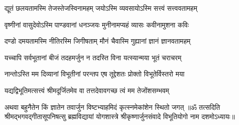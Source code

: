 \twolineshloka
{द्यूतं छलयतामस्मि तेजस्तेजस्विनामहम्}
{जयोऽस्मि व्यवसायोऽस्मि सत्त्वं सत्त्ववतामहम्}%

\twolineshloka
{वृष्णीनां वासुदेवोऽस्मि पाण्डवानां धनञ्जयः}
{मुनीनामप्यहं व्यासः कवीनामुशना कविः}%

\twolineshloka
{दण्डो दमयतामस्मि नीतिरस्मि जिगीषताम्}
{मौनं चैवास्मि गुह्यानां ज्ञानं ज्ञानवतामहम्}%

\twolineshloka
{यच्चापि सर्वभूतानां बीजं तदहमर्जुन}
{न तदस्ति विना यत्स्यान्मया भूतं चराचरम्}%

\twolineshloka
{नान्तोऽस्ति मम दिव्यानां विभूतीनां परन्तप}
{एष तूद्देशतः प्रोक्तो विभूतेर्विस्तरो मया}%

\twolineshloka
{यद्यद्विभूतिमत्सत्त्वं श्रीमदूर्जितमेव वा}
{तत्तदेवावगच्छ त्वं मम तेजोंशसम्भवम्}%

\twolineshloka
{अथवा बहुनैतेन किं ज्ञातेन तवार्जुन}
{विष्टभ्याहमिदं कृत्स्नमेकांशेन स्थितो जगत्}%
{॥ॐ तत्सदिति श्रीमद्भगवद्गीतासूपनिषत्सु ब्रह्मविद्यायां योगशास्त्रे श्रीकृष्णार्जुनसंवादे विभूतियोगो नाम दशमोऽध्यायः॥}